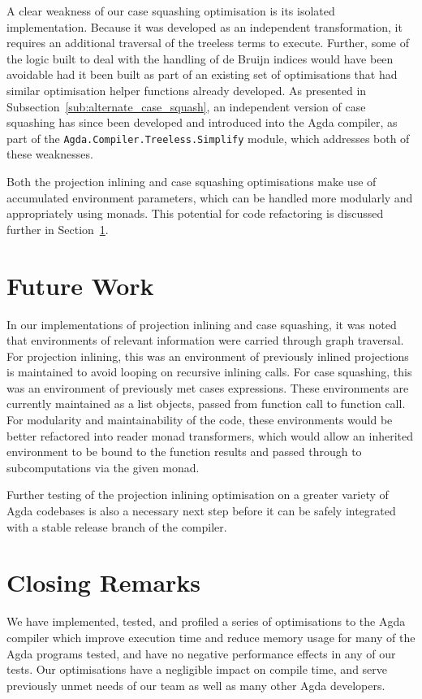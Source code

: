 A clear weakness of our case squashing optimisation is its isolated implementation. Because it was developed as an independent transformation, it requires an additional traversal of the treeless terms to execute. Further, some of the logic built to deal with the handling of de Bruijn indices would have been avoidable had it been built as part of an existing set of optimisations that had similar optimisation helper functions already developed. As presented in Subsection~\ref{sub:alternate_case_squash}, an independent version of case squashing has since been developed and introduced into the Agda compiler, as part of the \lstinline{Agda.Compiler.Treeless.Simplify} module, which addresses both of these weaknesses.

Both the projection inlining and case squashing optimisations make use of accumulated environment parameters, which can be handled more modularly and appropriately using monads. This potential for code refactoring is discussed further in Section~\ref{sec:future_work}.

\section{Future Work}
\label{sec:future_work}

In our implementations of projection inlining and case squashing, it was noted that environments of relevant information were carried through graph traversal. For projection inlining, this was an environment of previously inlined projections is maintained to avoid looping on recursive inlining calls. For case squashing, this was an environment of previously met cases expressions. These environments are currently maintained as a list objects, passed from function call to function call. For modularity and maintainability of the code, these environments would be better refactored into reader monad transformers, which would allow an inherited environment to be bound to the function results and passed through to subcomputations via the given monad.

Further testing of the projection inlining optimisation on a greater variety of Agda codebases is also a necessary next step before it can be safely integrated with a stable release branch of the compiler.

\section{Closing Remarks}
\label{sec:closing_remarks}

We have implemented, tested, and profiled a series of optimisations to the Agda compiler which improve execution time and reduce memory usage for many of the Agda programs tested, and have no negative performance effects in any of our tests. Our optimisations have a negligible impact on compile time, and serve previously unmet needs of our team as well as many other Agda developers.

